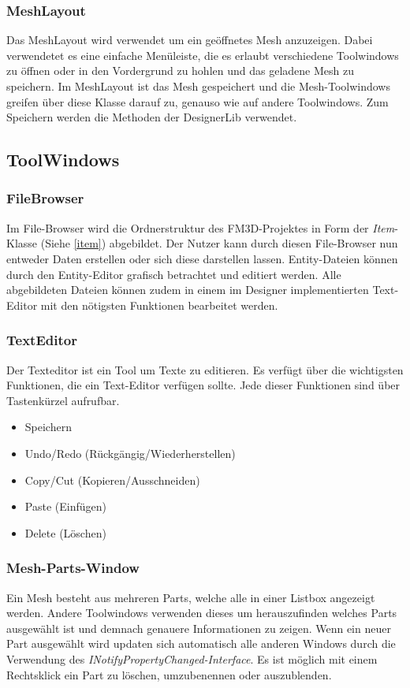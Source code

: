 \subsubsection{MeshLayout}
Das MeshLayout wird verwendet um ein geöffnetes Mesh anzuzeigen. Dabei verwendetet es eine einfache Menüleiste, die es erlaubt verschiedene Toolwindows zu öffnen oder in den Vordergrund zu hohlen und das geladene Mesh zu speichern. Im MeshLayout ist das Mesh gespeichert und die Mesh-Toolwindows greifen über diese Klasse darauf zu, genauso wie auf andere Toolwindows. Zum Speichern werden die Methoden der DesignerLib verwendet.

\subsection{ToolWindows}
\subsubsection{FileBrowser}
\label{filebrowser}
Im File-Browser wird die Ordnerstruktur des FM3D-Projektes in Form der \textit{Item}-Klasse (Siehe \cref{item}) abgebildet. Der Nutzer kann durch diesen File-Browser nun entweder Daten erstellen oder sich diese darstellen lassen. Entity-Dateien können durch den Entity-Editor grafisch betrachtet und editiert werden. Alle abgebildeten Dateien können zudem in einem im Designer implementierten Text-Editor mit den nötigsten Funktionen bearbeitet werden.

\subsubsection{TextEditor}
Der Texteditor ist ein Tool um Texte zu editieren.  Es verfügt über die wichtigsten Funktionen, die ein Text-Editor verfügen sollte. Jede dieser Funktionen sind über Tastenkürzel aufrufbar.
\begin{itemize}
	\item Speichern
	\item Undo/Redo (Rückgängig/Wiederherstellen)
	\item Copy/Cut (Kopieren/Ausschneiden)
	\item Paste (Einfügen)
	\item Delete (Löschen)
\end{itemize}

\subsubsection{Mesh-Parts-Window}
Ein Mesh besteht aus mehreren Parts, welche alle in einer Listbox angezeigt werden. Andere Toolwindows verwenden dieses um herauszufinden welches Parts ausgewählt ist und demnach genauere Informationen zu zeigen. Wenn ein neuer Part ausgewählt wird updaten sich automatisch alle anderen Windows durch die Verwendung des \textit{INotifyPropertyChanged-Interface}. Es ist möglich mit einem Rechtsklick ein Part zu löschen, umzubenennen oder auszublenden.

